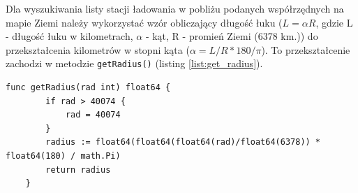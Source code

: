 
Dla wyszukiwania listy stacji ładowania w pobliżu podanych współrzędnych na mapie Ziemi należy wykorzystać wzór obliczający długość łuku (${L = \alpha R}$, gdzie L - długość łuku w kilometrach, ${\alpha}$ - kąt, R - promień Ziemi (6378 km.)) do przekształcenia kilometrów w stopni kąta (${\alpha = L/R*180/\pi}$). To przekształcenie zachodzi w metodzie \texttt{getRadius()} (listing \ref{list:get_radius}).
\begin{lstlisting}[label=list:get_radius,caption=Obliczenie dystansu przeszukiwania.,basicstyle=\tiny\ttfamily]
    func getRadius(rad int) float64 {
        if rad > 40074 {
            rad = 40074
        }
        radius := float64(float64(float64(rad)/float64(6378)) * float64(180) / math.Pi)
        return radius
    }
\end{lstlisting}

